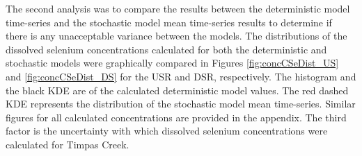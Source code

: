 \begin{linenumbers}
The second analysis was to compare the results between the deterministic model time-series and the stochastic model mean time-series results to determine if there is any unacceptable variance between the models.  The distributions of the dissolved selenium concentrations calculated for both the deterministic and stochastic models were graphically compared in Figures \ref{fig:concCSeDist_US} and \ref{fig:concCSeDist_DS} for the USR and DSR, respectively.  The histogram and the black KDE are of the calculated deterministic model values.  The red dashed KDE represents the distribution of the stochastic model mean time-series.  Similar figures for all calculated concentrations are provided in the appendix.  The third factor is the uncertainty with which dissolved selenium concentrations were calculated for Timpas Creek.


\end{linenumbers}
